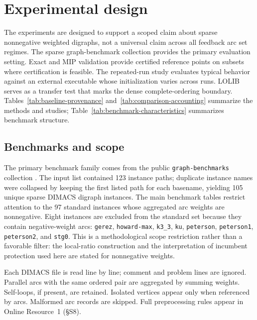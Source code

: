 \section{Experimental design}
\label{sec:experimental-design}

The experiments are designed to support a scoped claim about sparse nonnegative weighted digraphs, not a universal claim across all feedback arc set regimes. The sparse graph-benchmark collection provides the primary evaluation setting. Exact and MIP validation provide certified reference points on subsets where certification is feasible. The repeated-run study evaluates typical behavior against an external executable whose initialization varies across runs. LOLIB serves as a transfer test that marks the dense complete-ordering boundary. Tables~\ref{tab:baseline-provenance} and~\ref{tab:comparison-accounting} summarize the methods and studies; Table~\ref{tab:benchmark-characteristics} summarizes benchmark structure.





\subsection{Benchmarks and scope}

The primary benchmark family comes from the public \texttt{graph-benchmarks} collection \cite{graph_benchmarks_repo}. The input list contained 123 instance paths; duplicate instance names were collapsed by keeping the first listed path for each basename, yielding 105 unique sparse DIMACS digraph instances. The main benchmark tables restrict attention to the 97 standard instances whose aggregated arc weights are nonnegative. Eight instances are excluded from the standard set because they contain negative-weight arcs:
\texttt{gerez}, \texttt{howard-max}, \texttt{k3\_3}, \texttt{ku}, \texttt{peterson}, \texttt{peterson1}, \texttt{peterson2}, and \texttt{stg0}. This is a methodological scope restriction rather than a favorable filter: the local-ratio construction and the interpretation of incumbent protection used here are stated for nonnegative weights.

Each DIMACS file is read line by line; comment and problem lines are ignored. Parallel arcs with the same ordered pair are aggregated by summing weights. Self-loops, if present, are retained. Isolated vertices appear only when referenced by arcs. Malformed arc records are skipped. Full preprocessing rules appear in Online Resource~1 (\S S8).

